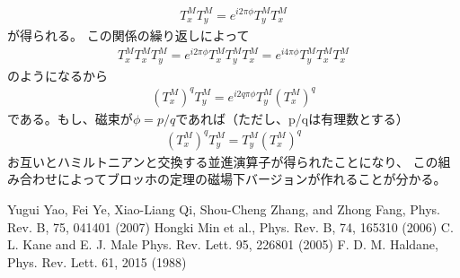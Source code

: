 \documentclass{article}
\begin{document}
\begin{eqnarray}
T_x^M T_y^M= e^{i2\pi\phi}T_y^M T_x^M
\end{eqnarray}
が得られる。
この関係の繰り返しによって
\begin{eqnarray}
T_x^M T_x^M T_y^M= e^{i2\pi\phi} T_x^M T_y^M T_x^M =e^{i4\pi\phi} T_y^M T_x^M
T_x^M 
\end{eqnarray}
のようになるから
\begin{eqnarray}
(T_x^M)^q T_y^M= e^{i2q\pi\phi}  T_y^M (T_x^M)^q
\end{eqnarray}
である。もし、磁束が$\phi=p/q$であれば（ただし、p/qは有理数とする）
\begin{eqnarray}
(T_x^M)^q T_y^M=  T_y^M (T_x^M)^q
\end{eqnarray}
お互いとハミルトニアンと交換する並進演算子が得られたことになり、
この組み合わせによってブロッホの定理の磁場下バージョンが作れることが分かる。
\begin{thebibliography}{n}
 Yugui Yao, Fei Ye, Xiao-Liang Qi, Shou-Cheng Zhang, and Zhong Fang, Phys. Rev. B, 75, 041401 (2007) 
 Hongki Min et al., Phys. Rev. B, 74, 165310 (2006)
 C. L. Kane and E. J. Male Phys. Rev. Lett. 95, 226801 (2005)
 F. D. M. Haldane, Phys. Rev. Lett. 61, 2015 (1988)

\end{thebibliography}
\end{document}
